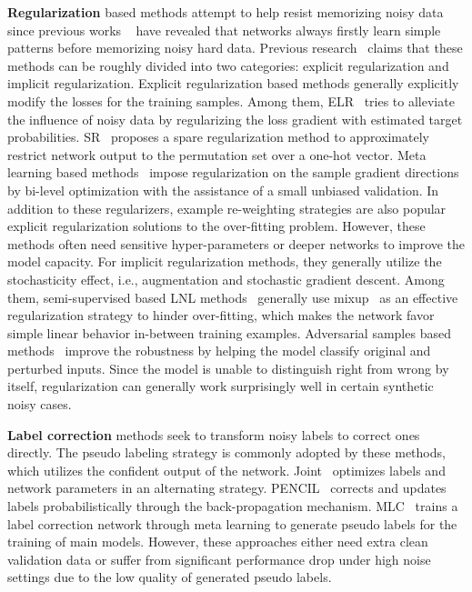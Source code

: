 \documentclass[10pt,twocolumn,letterpaper]{article}
\begin{document}
\textbf{Regularization} based methods attempt to help resist memorizing noisy data since previous works ~\cite{arpit2017closer} have revealed that networks always firstly learn simple patterns before memorizing noisy hard data. Previous research~\cite{song2022learning} claims that these methods can be roughly divided into two categories: explicit regularization and implicit regularization. Explicit regularization based methods generally explicitly modify the losses for the training samples. Among them, ELR~\cite{liu2020early} tries to alleviate the influence of noisy data by regularizing the loss gradient with estimated target probabilities. SR~\cite{zhou2021learning} proposes a spare regularization method to approximately restrict network output to the permutation set over a one-hot vector. Meta learning based methods~\cite{ren2018learning} impose regularization on the sample gradient directions by bi-level optimization with the assistance of a small unbiased validation. In addition to these regularizers, example re-weighting strategies are also popular explicit regularization solutions to the over-fitting problem. However, these methods often need sensitive hyper-parameters or deeper networks to improve the model capacity. For implicit regularization methods, they generally utilize the stochasticity effect, i.e., augmentation and stochastic gradient descent. Among them, semi-supervised based LNL methods~\cite{li2020dividemix, zheltonozhskii2022contrast} generally use mixup~\cite{zhang2017mixup} as an effective regularization strategy to hinder over-fitting, which makes the network favor simple linear behavior in-between training examples. Adversarial samples based methods~\cite{goodfellow2014explaining} improve the robustness by helping the model classify original and perturbed inputs. Since the model is unable to distinguish right from wrong by itself, regularization can generally work surprisingly well in certain synthetic noisy cases. 

\textbf{Label correction} methods seek to transform noisy labels to correct ones directly. The pseudo labeling strategy is commonly adopted by these methods, which utilizes the confident output of the network. Joint~\cite{tanaka2018joint} optimizes labels and network parameters in an alternating strategy. PENCIL~\cite{yi2019probabilistic} corrects and updates labels probabilistically through the back-propagation mechanism. MLC~\cite{zheng2021meta} trains a label correction network through meta learning to generate pseudo labels for the training of main models. However, these approaches either need extra clean validation data or suffer from significant performance drop under high noise settings due to the low quality of generated pseudo labels.
\end{document}
